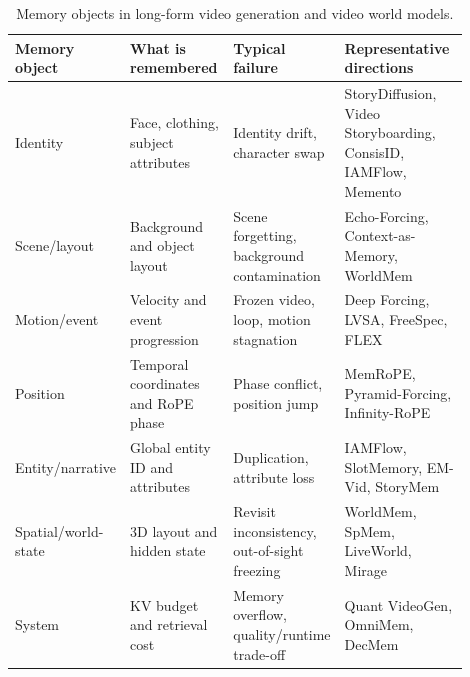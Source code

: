\begin{table}[t]
\centering
\small
\begin{tabular}{p{0.16\linewidth}p{0.23\linewidth}p{0.23\linewidth}p{0.28\linewidth}}
\toprule
\textbf{Memory object} & \textbf{What is remembered} & \textbf{Typical failure} & \textbf{Representative directions} \\
\midrule
Identity & Face, clothing, subject attributes & Identity drift, character swap & StoryDiffusion, Video Storyboarding, ConsisID, IAMFlow, Memento \\
Scene/layout & Background and object layout & Scene forgetting, background contamination & Echo-Forcing, Context-as-Memory, WorldMem \\
Motion/event & Velocity and event progression & Frozen video, loop, motion stagnation & Deep Forcing, LVSA, FreeSpec, FLEX \\
Position & Temporal coordinates and RoPE phase & Phase conflict, position jump & MemRoPE, Pyramid-Forcing, Infinity-RoPE \\
Entity/narrative & Global entity ID and attributes & Duplication, attribute loss & IAMFlow, SlotMemory, EM-Vid, StoryMem \\
Spatial/world-state & 3D layout and hidden state & Revisit inconsistency, out-of-sight freezing & WorldMem, SpMem, LiveWorld, Mirage \\
System & KV budget and retrieval cost & Memory overflow, quality/runtime trade-off & Quant VideoGen, OmniMem, DecMem \\
\bottomrule
\end{tabular}
\caption{Memory objects in long-form video generation and video world models.}
\label{tab:memory_objects}
\end{table}
